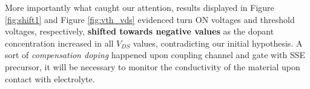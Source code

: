 More importantly what caught our attention, results displayed in Figure \ref{fig:shift1} and Figure \ref{fig:vth_vds} evidenced turn ON voltages and threshold voltages, respectively, \textbf{shifted towards negative values} as the dopant concentration increased in all $V_{DS}$ values, contradicting our initial hypothesis. A sort of \textit{compensation doping} happened upon coupling channel and gate with SSE precursor, it will be necessary to monitor the conductivity of the material  upon contact with electrolyte. %

